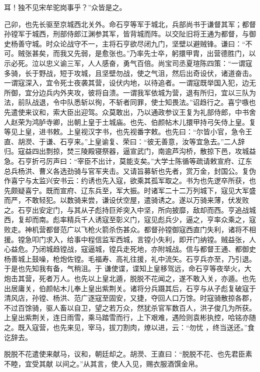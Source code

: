 \documentclass{article}
\begin{document}
耳！独不见宋牟驼岗事乎？”众皆是之。 

己卯，也先长驱至京城西北关外。命石亨等军于城北，兵部尚书于谦督其军；都督孙镗军于城西，刑部侍郎江渊参其军，皆背城而阵。以交阯旧将王通为都督，与御史杨善守城。时众论战守不一，主将石亨欲尽闭九门，坚壁以避贼锋。谦曰：“不可。贼张甚矣，而我又先弱，是愈张也。”乃率先士卒，躬擐甲胄，出营德胜门，以示必死。泣以忠义谕三军，人人感奋，勇气百倍。尚宝司丞夏瑄陈四策：“一谓寇多骑，长于野战，短于攻城，且坚壁勿战，使之气沮，然后出奇设伏，诸道奋击。一谓寇深入，宜令死士夜袭其营，设伏内地，以待追者。一谓寇既举国入犯，边无所御，宜分边兵内外夹攻，彼将自溃。一谓我军依城为营，退有所归，宜以三队为法，前队战退，令中队悉斩以徇，不斩者同罪，使士知畏法。”诏趋行之。喜宁嗾也先遣使来议和，索大臣出迎驾。众莫敢出，乃以通政参议王复为礼部侍郎，中书舍人赵荣为鸿胪寺卿，出朝上皇于土城庙。也先、伯颜帖木儿擐甲持弓矢侍上皇。复等见上皇，进书敕。上皇视汉字书，也先视番字敕。也先曰：“尔皆小官，急令王
\newpage
直、胡濙、于谦、石亨来。”上皇谕复、荣曰：“彼无善意，汝等宜急去。”二人辞归。寇益四出剽掠，焚三陵殿寝祭器，逼宣武门，南逾芦沟桥，散掠下邑，攻城益急。石亨折弓厉声曰：“宰臣不出计，莫能支矣。”大学士陈循等疏请敕宣府、辽东总兵杨洪、曹义各选劲骑与官军夹击。又请旨募斩也先者，赏万金，封国公。复伪作喜宁与太监兴安书云：约诱也先入寇，欲乘其孤军取之。书为也先逻卒所获，也先颇疑喜宁。既而宣府、辽东兵至，军大振。时诸军二十二万列城下，寇见大军盛而严，不敢轻犯。以数骑来尝，谦设伏空屋，遣骑诱之。遂以万骑来薄，伏发败之。石亨出安定门，与其从子彪持巨斧突入中坚，所向披靡，敌却而西。亨追战城西，复却而南。彪率精兵千人诱寇至彰义门，寇见彪兵少，逼之，亨率众乘之，寇败走。神机营都督范广以飞枪火箭杀伤甚众。都督孙镗御寇西直门失利，诸将不相援。镗急叩门求入，给事中程信监军西城，言镗小失利，即开门纳镗。贼益张，人心益危。乃闭城趋镗战，寇逼城，镗兵走死地，亦附城战。信与都督王通、都御史杨善城上鼓噪，枪炮佐镗。毛福寿、高礼往援，礼中流矢。石亨兵亦至，乃引退。于是也先知我有备，气稍沮。于
\newpage
谦使谍，谍知上皇移驾远，命石亨等夜举火，大炮击其营，死者万人。也先以上皇北遁，脱脱不花闻之，遂不敢入关，亦遁。也先出居庸关，伯颜帖木儿奉上皇出紫荆关。诸将分兵蹑其后，石亨与从子彪复破寇于清风店，孙镗、杨洪、范广逐寇至固安，又捷，夺回人口万馀。时寇骑散掠各郡，不过百馀骑，驱人畜以自卫，望之若万众，然犹杀官军数百人，洪子俊几为所获。上皇出紫荆关，连日雨雪，乘马踏雪而行，上下艰难，遇险则袁彬执控，哈铭亦随之。既入寇营，也先来见，宰马，拔刀割肉，燎以进，云：“勿忧
，终当送还。”食讫辞去。 

脱脱不花遣使来献马，议和，朝廷却之。胡濙、王直曰：“脱脱不花、也先君臣素不睦，宜受其献
以间之。”从其言，使人入见，赐衣服酒馔金帛。 
\end{document}
